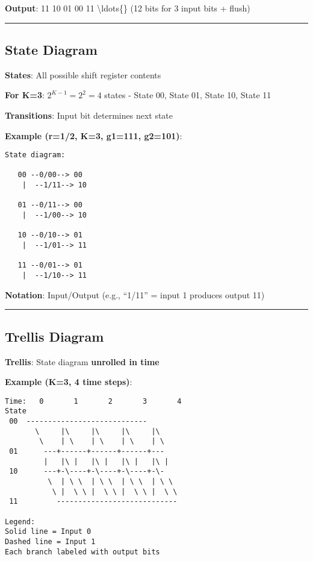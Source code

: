 \textbf{Output}: 11 10 01 00 11 \textbackslash ldots\{\} (12 bits for 3
input bits + flush)

\begin{center}\rule{0.5\linewidth}{0.5pt}\end{center}

\subsection{State Diagram}\label{state-diagram}

\textbf{States}: All possible shift register contents

\textbf{For K=3}: \(2^{K-1} = 2^2 = 4\) states - State 00, State 01,
State 10, State 11

\textbf{Transitions}: Input bit determines next state

\textbf{Example (r=1/2, K=3, g1=111, g2=101)}:

\begin{verbatim}
State diagram:

   00 --0/00--> 00
    |  --1/11--> 10
    
   01 --0/11--> 00
    |  --1/00--> 10
    
   10 --0/10--> 01
    |  --1/01--> 11
    
   11 --0/01--> 01
    |  --1/10--> 11
\end{verbatim}

\textbf{Notation}: Input/Output (e.g., ``1/11'' = input 1 produces
output 11)

\begin{center}\rule{0.5\linewidth}{0.5pt}\end{center}

\subsection{Trellis Diagram}\label{trellis-diagram}

\textbf{Trellis}: State diagram \textbf{unrolled in time}

\textbf{Example (K=3, 4 time steps)}:

\begin{verbatim}
Time:   0       1       2       3       4
State
 00  ----------------------------
       \     |\     |\     |\     |\
        \    | \    | \    | \    | \
 01      ---+------+------+------+---
         |   |\ |   |\ |   |\ |   |\ |
 10      ---+-\----+-\----+-\----+-\-
          \  | \ \  | \ \  | \ \  | \ \
           \ |  \ \ |  \ \ |  \ \ |  \ \
 11         ----------------------------

Legend:
Solid line = Input 0
Dashed line = Input 1
Each branch labeled with output bits
\end{verbatim}

